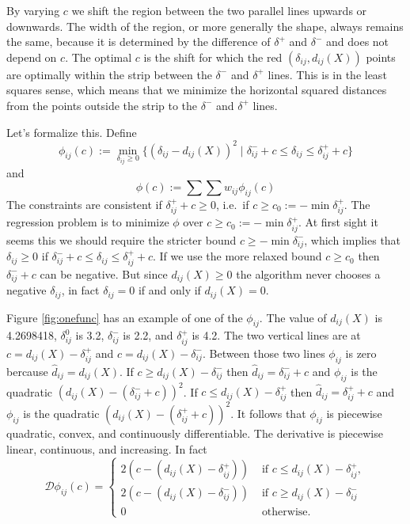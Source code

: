 \documentclass[
  12pt,
]{article}
\begin{document}
By varying \(c\) we shift the region between the two parallel lines upwards or downwards. The width of the region, or more generally the shape, always remains the same, because it is determined by the difference of \(\delta^+\) and \(\delta^-\) and does not depend on \(c\). The
optimal \(c\) is the shift for which the red \((\delta_{ij},d_{ij}(X))\) points are optimally within the strip between the \(\delta^-\) and \(\delta^+\) lines. This is in the least squares sense, which
means that we minimize the horizontal squared distances from the points outside the strip to the
\(\delta^-\) and \(\delta^+\) lines.

Let's formalize this. Define
\begin{equation}
\phi_{ij}(c):=\min_{\delta_{ij}\geq 0}\{(\delta_{ij}-d_{ij}(X))^2\mid \delta^-_{ij}+c\leq\delta_{ij}\leq\delta^+_{ij}+c\}
\label{eq:phiijdef}
\end{equation}
and
\begin{equation}
\phi(c):=\sum\sum w_{ij}\phi_{ij}(c)
\label{eq:phidef}
\end{equation}
The constraints are consistent if \(\delta_{ij}^++c\geq 0\), i.e.~if \(c\geq c_0:=-\min\delta_{ij}^+\).
The regression problem is to minimize \(\phi\) over \(c\geq c_0:=-\min\delta_{ij}^+\). At first sight it seems this we should require the stricter bound \(c\geq-\min\delta_{ij}^-\), which implies
that \(\delta_{ij}\geq 0\) if \(\delta^-_{ij}+c\leq\delta_{ij}\leq\delta^+_{ij}+c\). If we use the more relaxed bound \(c\geq c_0\) then \(\delta_{ij}^-+c\) can be negative. But since \(d_{ij}(X)\geq 0\) the algorithm never chooses a negative \(\delta_{ij}\), in fact \(\delta_{ij}=0\) if and only if \(d_{ij}(X)=0\).

Figure \ref{fig:onefunc} has an example of one of the \(\phi_{ij}\). The value of
\(d_{ij}(X)\) is 4.2698418, \(\delta_{ij}^0\) is 3.2, \(\delta_{ij}^-\) is 2.2,
and \(\delta_{ij}^+\) is 4.2.
The two vertical lines
are at \(c=d_{ij}(X)-\delta_{ij}^+\) and \(c=d_{ij}(X)-\delta_{ij}^-\). Between those
two lines \(\phi_{ij}\) is zero bercause \(\hat d_{ij}=d_{ij}(X)\). If \(c\geq d_{ij}(X)-\delta_{ij}^-\) then \(\hat d_{ij}=\delta_{ij}^-+c\) and \(\phi_{ij}\)
is the quadratic \((d_{ij}(X)-(\delta_{ij}^-+c))^2\). If \(c\leq d_{ij}(X)-\delta_{ij}^+\)
then \(\hat d_{ij}=\delta_{ij}^++c\) and \(\phi_{ij}\)
is the quadratic \((d_{ij}(X)-(\delta_{ij}^++c))^2\). It follows that \(\phi_{ij}\) is
piecewise quadratic, convex, and continuously differentiable. The derivative
is piecewise linear, continuous, and increasing. In fact
\begin{equation}
\mathcal{D}\phi_{ij}(c)=\begin{cases}
2(c-(d_{ij}(X)-\delta_{ij}^+))&\text{ if }c\leq d_{ij}(X)-\delta_{ij}^+,\\
2(c-(d_{ij}(X)-\delta_{ij}^-))&\text{ if }c\geq d_{ij}(X)-\delta_{ij}^-\,\\
0&\text{ otherwise}.
\end{cases}\label{eq:derivs}
\end{equation}
\end{document}
